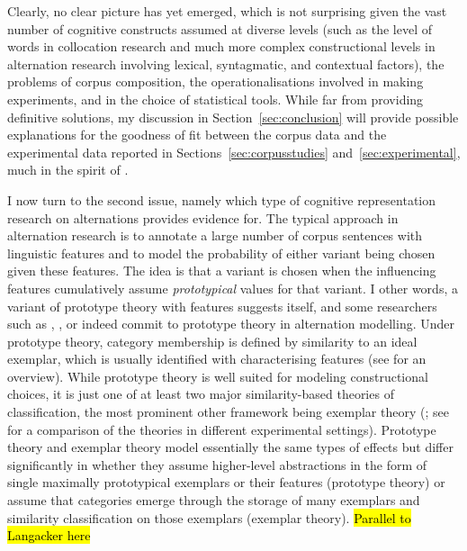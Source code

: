 Clearly, no clear picture has yet emerged, which is not surprising given the vast number of cognitive constructs assumed at diverse levels (such as the level of words in collocation research and much more complex constructional levels in alternation research involving lexical, syntagmatic, and contextual factors), the problems of corpus composition, the operationalisations involved in making experiments, and in the choice of statistical tools.
While far from providing definitive solutions, my discussion in Section~\ref{sec:conclusion} will provide possible explanations for the goodness of fit between the corpus data and the experimental data reported in Sections~\ref{sec:corpusstudies} and~\ref{sec:experimental}, much in the spirit of \citet{Dabrowska2014}.

I now turn to the second issue, namely which type of cognitive representation research on alternations provides evidence for.
The typical approach in alternation research is to annotate a large number of corpus sentences with linguistic features and to model the probability of either variant being chosen given these features.
The idea is that a variant is chosen when the influencing features cumulatively assume \textit{prototypical} values for that variant.
I other words, a variant of prototype theory with features \citep{Rosch1978} suggests itself, and some researchers such as \cite{Gries2003}, \cite{NessetJanda2010}, or \cite{Schaefer2016c} indeed commit to prototype theory in alternation modelling.
Under prototype theory, category membership is defined by similarity to an ideal exemplar, which is usually identified with characterising features (see \citealp{Taylor2008} for an overview).
While prototype theory is well suited for modeling constructional choices, it is just one of at least two major similarity-based theories of classification, the most prominent other framework being exemplar theory (\citealp{MedinSchaffer1978,Hintzman1986}; see \citealp{StormsEa2000} for a comparison of the theories in different experimental settings).
Prototype theory and exemplar theory model essentially the same types of effects but differ significantly in whether they assume higher-level abstractions in the form of single maximally prototypical exemplars or their features (prototype theory) or assume that categories emerge through the storage of many exemplars and similarity classification on those exemplars (exemplar theory).
\hl{Parallel to Langacker here}


